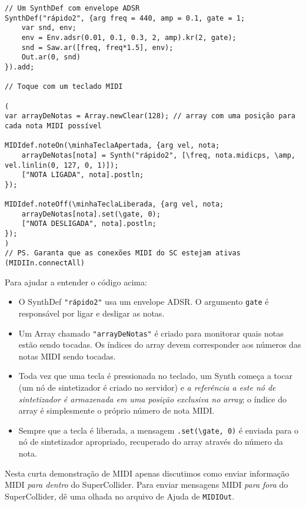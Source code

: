 \begin{lstlisting}[style=SuperCollider-IDE, basicstyle=\scttfamily\footnotesize]
 // Um SynthDef com envelope ADSR
SynthDef("rápido2", {arg freq = 440, amp = 0.1, gate = 1;
	var snd, env;
	env = Env.adsr(0.01, 0.1, 0.3, 2, amp).kr(2, gate);
	snd = Saw.ar([freq, freq*1.5], env);	
	Out.ar(0, snd)
}).add;

// Toque com um teclado MIDI

(
var arrayDeNotas = Array.newClear(128); // array com uma posição para cada nota MIDI possível

MIDIdef.noteOn(\minhaTeclaApertada, {arg vel, nota;
	arrayDeNotas[nota] = Synth("rápido2", [\freq, nota.midicps, \amp, vel.linlin(0, 127, 0, 1)]);
	["NOTA LIGADA", nota].postln;
});
	
MIDIdef.noteOff(\minhaTeclaLiberada, {arg vel, nota;
	arrayDeNotas[nota].set(\gate, 0);
	["NOTA DESLIGADA", nota].postln;
});
)
// PS. Garanta que as conexões MIDI do SC estejam ativas (MIDIIn.connectAll)
 \end{lstlisting} 
 
Para ajudar a entender o código acima:

\begin{itemize}
\item O SynthDef \texttt{"rápido2"} usa um envelope ADSR. O argumento \texttt{gate} é responsável por ligar e desligar as notas.
\item Um Array chamado \texttt{"arrayDeNotas"} é criado para monitorar quais notas estão sendo tocadas. Os índices do array devem corresponder aos números das notas MIDI sendo tocadas.
\item Toda vez que uma tecla é pressionada no teclado, um Synth começa a tocar (um nó de sintetizador é criado no servidor) e \emph{a referência a este nó de sintetizador é armazenada em uma posição exclusiva no array}; o índice do array é simplesmente o próprio número de nota MIDI.
\item Sempre que a tecla é liberada, a mensagem \texttt{.set(\textbackslash gate, 0)} é enviada para o nó de sintetizador apropriado, recuperado do array através do número da nota.
\end{itemize}

Nesta curta demonstração de MIDI apenas discutimos como enviar informação MIDI \emph{para dentro} do SuperCollider. Para enviar mensagens MIDI \emph{para fora} do SuperCollider, dê uma olhada no arquivo de Ajuda de \texttt{MIDIOut}.

